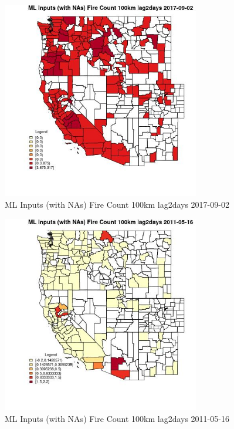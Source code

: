 \begin{figure} 
\centering  
\includegraphics[width=0.77\textwidth]{Code_Outputs/Report_ML_input_PM25_Step4_part_e_de_duplicated_aves_compiled_2019-05-21wNAs_CountyFire_Count_100km_lag2daysMean2017-09-02.jpg} 
\caption{\label{fig:Report_ML_input_PM25_Step4_part_e_de_duplicated_aves_compiled_2019-05-21wNAsCountyFire_Count_100km_lag2daysMean2017-09-02}ML Inputs (with NAs) Fire Count 100km lag2days 2017-09-02} 
\end{figure} 
 

\begin{figure} 
\centering  
\includegraphics[width=0.77\textwidth]{Code_Outputs/Report_ML_input_PM25_Step4_part_e_de_duplicated_aves_compiled_2019-05-21wNAs_CountyFire_Count_100km_lag2daysMean2011-05-16.jpg} 
\caption{\label{fig:Report_ML_input_PM25_Step4_part_e_de_duplicated_aves_compiled_2019-05-21wNAsCountyFire_Count_100km_lag2daysMean2011-05-16}ML Inputs (with NAs) Fire Count 100km lag2days 2011-05-16} 
\end{figure} 
 

